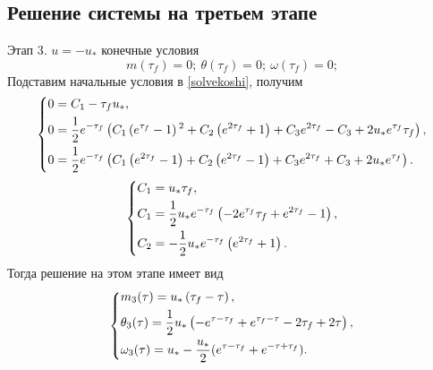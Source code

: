 \documentclass[a4paper,12pt, openany]{book}
\theoremstyle{plain} %
\theoremstyle{definition} %
\theoremstyle{remark} %
\numberwithin{equation}{chapter}
\begin{document}
{\subsection*{Решение системы на третьем этапе}
Этап 3. $u=-u_*$ конечные условия
\[
    m(\tau_f)=0; \ \theta(\tau_f)=0;\ \omega(\tau_f)=0;
\]
Подставим начальные условия в \eqref{solvekoshi}, получим
\[
    \left\{ {\begin{aligned}
                 & 0 = C_1-\tau_f  u_*, \hfill                                               \\
                 & 0 = \frac{1}{2} e^{-\tau _f} \left(C_1 \left(e^{\tau _f}-1\right){}^2+C_2
                \left(e^{2 \tau _f}+1\right)+C_3 e^{2 \tau _f}-C_3+2 u_* e^{\tau _f} \tau
                _f\right), \hfill                                                            \\
                 & 0 = \frac{1}{2} e^{-\tau _f} \left(C_1 \left(e^{2 \tau _f}-1\right)+C_2
                \left(e^{2 \tau _f}-1\right)+C_3 e^{2 \tau _f}+C_3+2 u_* e^{\tau
                _f}\right)  . \hfill                                                         \\
            \end{aligned}} \right.
\]
\[
    \left\{ {\begin{aligned}
                 & C_1 = u_* \tau _f, \hfill                                                  \\
                 & C_1 = \frac{1}{2} u_* e^{-\tau _f} \left(-2 e^{\tau _f} \tau _f+e^{2 \tau
                _f}-1\right), \hfill                                                          \\
                 & C_2 = -\frac{1}{2} u_* e^{-\tau _f} \left(e^{2 \tau _f}+1\right)  . \hfill \\
            \end{aligned}} \right.
\]
Тогда решение на этом этапе имеет вид
\[
    \left\{ {\begin{aligned}
                 & m_3(\tau) = u_* \left(\tau _f-\tau \right), \hfill                                           \\
                 & \theta_3(\tau) = \frac{1}{2} u_* \left(-e^{\tau -\tau _f}+e^{\tau _f-\tau }-2 \tau _f+2 \tau
                \right), \hfill                                                                                 \\
                 & \omega_3(\tau) =u_*-\frac{u_*}{2}(e^{\tau-\tau_f}+e^{-\tau+\tau_f}) . \hfill                 \\
            \end{aligned}} \right.
\]

}
\end{document}
